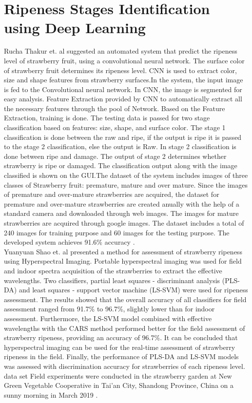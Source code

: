 \section{Ripeness Stages Identification using Deep Learning}

Rucha Thakur et. al  suggested an automated system that predict the ripeness 
level of strawberry fruit, using a convolutional neural network. The surface 
color of strawberry fruit determines its ripeness level. CNN is used to extract 
color, size and shape features from strawberry surfaces.In the system, the input 
image is fed to the Convolutional neural network. In CNN, the image is segmented 
for easy analysis. Feature Extraction provided by CNN to automatically extract all 
the necessary features through the pool of Network. Based on the Feature Extraction, 
training is done. The testing data is passed for two stage classification 
based on features: size, shape, and surface color. The stage 1 classification is done between 
the raw and ripe, if the output is ripe it is passed to the stage 2 classification, else the 
output is Raw. In stage 2 classification is done between ripe and damage. The output of stage 2
determines whether strawberry is ripe or damaged. The classification output along with the image 
classified is shown on the GUI.The dataset of the system includes images of three classes of 
Strawberry fruit: premature, mature and over mature. Since the images of premature and over-mature 
strawberries are acquired, the dataset for premature and over-mature strawberries are created 
anually with the help of a standard camera and downloaded through web images. The images for 
mature strawberries are acquired through google images. The dataset includes a total of 240 images 
for training purpose and 60 images for the testing purpose. The developed system 
achieves 91.6\% accuracy \cite{tha20}. \\

Yuanyuan Shao et. al presented a method for assessment of strawberry ripeness using 
Hyperspectral Imaging. Portable hyperspectral imaging was used for field and indoor 
spectra acquisition of the strawberries to extract the effective wavelengths. Two 
classifiers, partial least squares - discriminant analysis (PLS-DA) 
and least squares - support vector machine (LS-SVM) were used for ripeness assessment. The 
results showed that the overall accuracy of all classifiers for field assessment ranged from 
91.7\% to 96.7\%, slightly lower than for indoor assessment. Furthermore, the LS-SVM model 
combined with effective wavelengths with the CARS method performed better for the field 
assessment of strawberry ripeness, providing an accuracy of 96.7\%. It can be concluded 
that hyperspectral imaging can be used for the real-time assessment of strawberry ripeness 
in the field. Finally, the performance of PLS-DA and LS-SVM models was assessed with 
discrimination accuracy for strawberries of each ripeness level. data set Field experiments
were conducted in the strawberry garden at New Green Vegetable Cooperative in Tai'an City, 
Shandong Province, China on a sunny morning in March 2019 \cite{sha20}.

